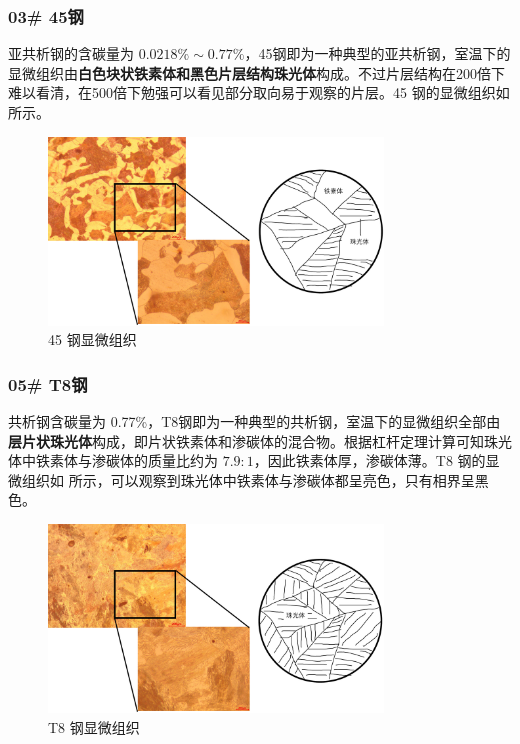 \documentclass[a4paper,utf8]{article}
\begin{document}
        \subsubsection{03\# 45钢}
            亚共析钢的含碳量为 $0.0218\%\sim 0.77\%$，45钢即为一种典型的亚共析钢，室温下的显微组织由\textbf{白色块状铁素体和黑色片层结构珠光体}构成。不过片层结构在200倍下难以看清，在500倍下勉强可以看见部分取向易于观察的片层。45 钢的显微组织如 所示。
            \begin{figure}[!ht]
                \includegraphics[height=50mm]{result/2.pdf}
                \caption{45 钢显微组织\label{fig:2}}
            \end{figure}

        \subsubsection{05\# T8钢}
            共析钢含碳量为 0.77\%，T8钢即为一种典型的共析钢，室温下的显微组织全部由\textbf{层片状珠光体}构成，即片状铁素体和渗碳体的混合物。根据杠杆定理计算可知珠光体中铁素体与渗碳体的质量比约为 $7.9:1$，因此铁素体厚，渗碳体薄。T8 钢的显微组织如 所示，可以观察到珠光体中铁素体与渗碳体都呈亮色，只有相界呈黑色。
            \begin{figure}[!ht]
                \includegraphics[height=50mm]{result/3.pdf}
                \caption{T8 钢显微组织\label{fig:3}}
            \end{figure}
\end{document}
